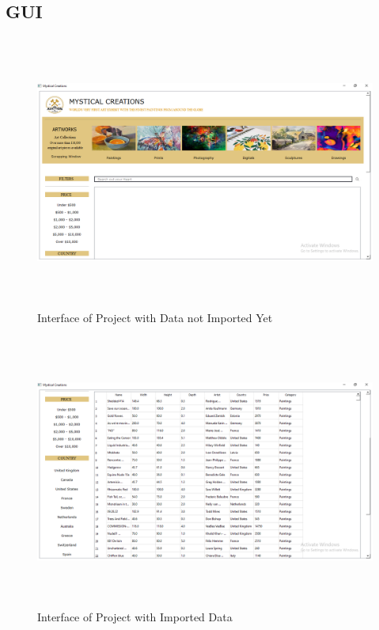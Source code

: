 \documentclass[12pt]{article}
\begin{document}
    \subsection{GUI}
    \begin{figure}[ht!]
	    \includegraphics[width = 16cm, height = 9cm]{Unloaded Data.PNG}
	    \renewcommand{\thefigure}{3.1}
	    \caption{Interface of Project with Data not Imported Yet}
    \end{figure}
    \begin{figure}[ht!]
	    \includegraphics[width = 16cm, height = 9cm]{Imported Data.PNG}
	    \renewcommand{\thefigure}{3.2}
	    \caption{Interface of Project with Imported Data}
    \end{figure}
    
\end{document}
